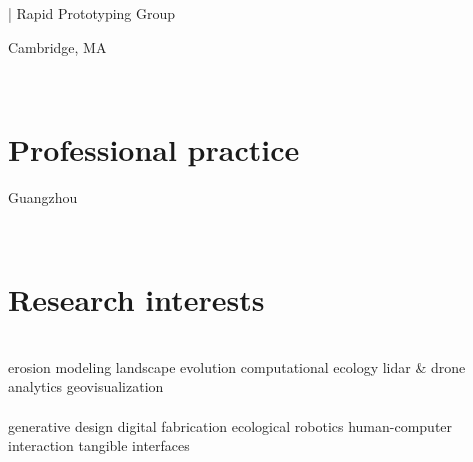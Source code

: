 \documentclass[]{baharmon_cv}
\renewcommand{\baselinestretch}{1.15}
\begin{document}
\begin{minipage}[t]{0.85\textwidth} 
\renewcommand{\baselinestretch}{1.75}
  | Rapid Prototyping Group
\end{minipage}
\begin{minipage}[t]{0.15\textwidth} 
Cambridge, MA
\end{minipage}\\

\sectiondivider


\section{Professional practice}
\begin{minipage}[t]{0.85\textwidth} 
\end{minipage}
\begin{minipage}[t]{0.15\textwidth} 
Guangzhou%
\end{minipage}\\

\clearpage


\section{Research interests}

\vspace*{0.3cm}
 \\ \vspace*{0.1cm}
\normalsize{
erosion modeling
\textbullet{}
landscape evolution
\textbullet{}
computational ecology 
\textbullet{}
lidar \& drone analytics
\textbullet{}
geovisualization
}
\\

 \vspace{0.1em} \\ \vspace*{0.1cm}
\normalsize{
generative design
\textbullet{}
digital fabrication
\textbullet{}
ecological robotics
\textbullet{}
human-computer interaction
\textbullet{}
tangible interfaces
}
\\
\end{document}

